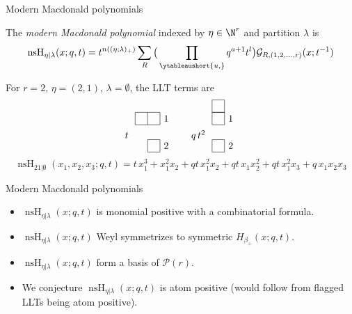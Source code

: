 \documentclass[dvipsnames]{beamer}
\newcommand{\Gcal}{{\mathcal G}}
\newcommand{\nsH}{\operatorname{nsH}}
\theoremstyle{definition}
\newcounter{c}
\begin{document}
\begin{frame}{Modern Macdonald polynomials}
  \begin{definition}
    The \emph{modern Macdonald polynomial} indexed by \(\eta \in
    \N^r\) and partition \(\lambda\) is
    \[
      \nsH_{\eta|\lambda}(x;q,t) = t^{n((\eta;\lambda)_+)} \sum_R \big(\prod_{\ytableaushort{u,{}}} q^{a+1}
        t^l \big)
      \Gcal_{R,(1,2,\ldots,r)}(x;t^{-1})
    \]
  \end{definition}
    For \(r=2\), \(\eta=(2,1)\), \(\lambda = \emptyset\), the LLT
    terms are
\begin{equation*}\label{e:H-HHL-ribbon-tuples}
\setlength{\arraycolsep}{0cm}
\begin{array}{cccc}
t \ \ &
\begin{tikzpicture}[scale=.45,baseline=.5cm]
  \foreach \beta / \alpha /  \z in {0/-1/0, 0/-2/2.2}
     \draw[yshift=\z cm] (\alpha,0)  grid (\beta, 1);
     \node at (.5,.5+2.2) {$1$};
     \node at (.5,.5) {$2$};
      \end{tikzpicture}
& \qquad q\, t^{2} \ \ &
\begin{tikzpicture}[scale=.45,baseline=.5cm]
  \foreach \beta / \alpha /  \z in {0/-1/0, 0/-1/2.2, 0/-1/3.2}
     \draw[yshift=\z cm] (\alpha,0)  grid (\beta, 1);
     \node at (.5,.5+2.2)  {$1$};
     \node at (.5,.5) {$2$};
      \end{tikzpicture}
\end{array}
\end{equation*}
\[
\nsH_{21|\emptyset}(x_1,x_2,x_3;q,t) = t\,x_1^3  +  x_1^2x_2  +
qt\,x_1^2x_2  +  qt\,x_1x_2^2  +  qt\,x_1^2x_3 +  q\,x_1x_2x_3
\]
\end{frame}
\begin{frame}{Modern Macdonald polynomials}
  \begin{itemize}
  \item \(\nsH_{\eta | \lambda}(x;q,t)\) is monomial positive with a
    combinatorial formula.\pause
  \item \(\nsH_{\eta | \lambda}(x;q,t)\) Weyl symmetrizes to symmetric
    \(H_{\beta_+}(x;q,t)\).\pause
  \item \(\nsH_{\eta | \lambda}(x;q,t)\) form a basis of \(\mathcal{P}(r)\).\pause
  \item We conjecture \(\nsH_{\eta | \lambda}(x;q,t)\) is atom positive
    (would follow from flagged LLTs being atom positive).
  \end{itemize}
\end{frame}
\end{document}
